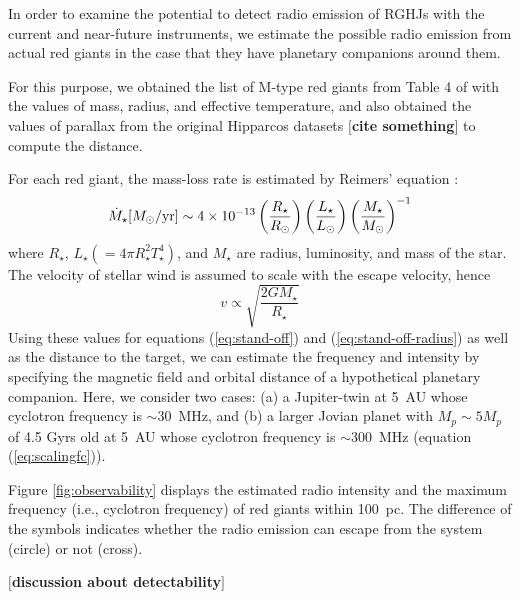\documentclass{emulateapj}
\def\memoYF#1{\color{red}$[${\bf #1}$]$ \color{black}}
\begin{document}
In order to examine the potential to detect radio emission of RGHJs with the current and near-future instruments, we estimate the possible radio emission from actual red giants in the case that they have planetary companions around them. 

For this purpose, we obtained the list of M-type red giants from Table 4 of \citet{dumm1998} with the values of mass, radius, and effective temperature, and also obtained the values of parallax from the original Hipparcos datasets \memoYF{cite something} to compute the distance. 

For each red giant, the mass-loss rate is estimated by Reimers' equation \citep{reimers1975}:
\begin{equation}
\dot M_{\star } [M_{\odot }{\rm /yr}] \sim 4 \times 10^{-13} \left( \frac{R_{\star }}{R_{\odot }} \right)\left( \frac{L_{\star }}{L_{\odot }} \right) \left( \frac{M_{\star }}{M_{\odot }} \right)^{-1}
\end{equation}
where $R_{\star }$, $L_{\star } (=4\pi R_{\star }^2 T_{\star }^4)$, and $M_{\star}$ are radius, luminosity, and mass of the star. 
The velocity of stellar wind is assumed to scale with the escape velocity, hence
\begin{equation}
v \propto \sqrt{\frac{2GM_{\star }}{R_{\star }}}
\end{equation}
Using these values for equations (\ref{eq:stand-off}) and (\ref{eq:stand-off-radius}) as well as the distance to the target, we can estimate the frequency and intensity by specifying the magnetic field and orbital distance of a hypothetical planetary companion. 
Here, we consider two cases: (a) a Jupiter-twin at 5~AU whose cyclotron frequency is $\sim 30$~MHz, and (b) a larger Jovian planet with $M_p\sim 5M_p$ of 4.5 Gyrs old at 5~AU whose cyclotron frequency is $\sim 300$~MHz (equation (\ref{eq:scalingfc})). 

Figure \ref{fig:observability} displays the estimated radio intensity and the maximum frequency (i.e., cyclotron frequency) of red giants within 100~pc.  
The difference of the symbols indicates whether the radio emission can escape from the system (circle) or not (cross). 


\memoYF{discussion about detectability}

\end{document}
